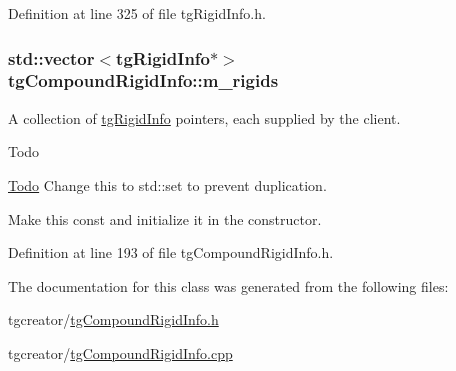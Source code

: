 Definition at line 325 of file tg\-Rigid\-Info.\-h.

\hypertarget{classtg_compound_rigid_info_a4131882aec347aa599442b578ac6d4e9}{
\subsubsection[{m\-\_\-rigids}]{\setlength{\rightskip}{0pt plus 5cm}std\-::vector$<${\bf tg\-Rigid\-Info}$\ast$$>$ tg\-Compound\-Rigid\-Info\-::m\-\_\-rigids\hspace{0.3cm}{\ttfamily [protected]}}}\label{classtg_compound_rigid_info_a4131882aec347aa599442b578ac6d4e9}
A collection of \hyperlink{classtg_rigid_info}{tg\-Rigid\-Info} pointers, each supplied by the client. \begin{DoxyRefDesc}{Todo}
\item[\hyperlink{todo__todo000077}{Todo}]Change this to std\-::set to prevent duplication. 

Make this const and initialize it in the constructor. \end{DoxyRefDesc}


Definition at line 193 of file tg\-Compound\-Rigid\-Info.\-h.



The documentation for this class was generated from the following files\-:\begin{DoxyCompactItemize}
\item 
tgcreator/\hyperlink{tg_compound_rigid_info_8h}{tg\-Compound\-Rigid\-Info.\-h}\item 
tgcreator/\hyperlink{tg_compound_rigid_info_8cpp}{tg\-Compound\-Rigid\-Info.\-cpp}\end{DoxyCompactItemize}
